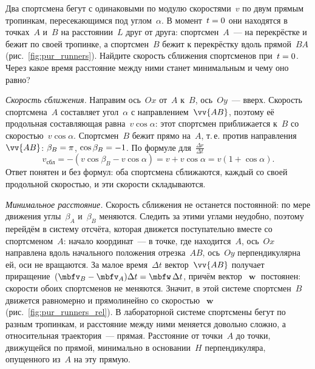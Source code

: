 \documentclass[../main.tex]{subfiles}
\begin{document}
\begin{example}
Два спортсмена бегут с одинаковыми по модулю скоростями~$v$ по двум прямым
тропинкам, пересекающимся под углом~$\alpha$. В момент~$t \hm= 0$ они находятся в
точках~$A$ и~$B$ на расстоянии~$L$ друг от друга: спортсмен~$A$~--- на перекрёстке
и бежит по своей тропинке, а спортсмен~$B$ бежит к перекрёстку вдоль прямой~$BA$
(рис.~\ref{fig:pur_runners}). Найдите скорость сближения спортсменов при~$t \hm= 0$.
Через какое время расстояние между ними станет минимальным и чему оно равно?


\noindent\textit{Скорость сближения.} Направим ось~$Ox$ от~$A$ к~$B$, ось~$Oy$~---
вверх. Скорость спортсмена~$A$ составляет угол~$\alpha$ с направлением~$\vv{AB}$,
поэтому её продольная составляющая равна~$v\cos\alpha$: этот спортсмен приближается
к~$B$ со скоростью~$v\cos\alpha$. Спортсмен~$B$ бежит прямо на~$A$, т.\,е. против
направления~$\vv{AB}$: $\beta_B \hm= \pi$, $\cos\beta_B \hm= -1$. По формуле для~$\frac{\Delta r}{\Delta t}$
\[
v_{\text{сбл}} = -(v\cos\beta_B - v\cos\alpha) = v + v\cos\alpha = v(1 + \cos\alpha).
\]
Ответ понятен и без формул: оба спортсмена сближаются, каждый со своей продольной
скоростью, и эти скорости складываются.

\noindent\textit{Минимальное расстояние.} Скорость сближения не останется
постоянной: по мере движения углы~$\beta_A$ и~$\beta_B$ меняются. Следить за этими
углами неудобно, поэтому перейдём в систему отсчёта, которая движется поступательно
вместе со спортсменом~$A$: начало координат~--- в точке, где находится~$A$, ось~$Ox$
направлена вдоль начального положения отрезка~$AB$, ось~$Oy$ перпендикулярна ей, оси
не вращаются. За малое время~$\Delta t$ вектор~$\vv{AB}$ получает приращение~$(\mbfv_B - \mbfv_A)\Delta t \hm= \mbfw\,\Delta t$, причём вектор~$\mbfw$ постоянен:
скорости обоих спортсменов не меняются. Значит, в этой системе спортсмен~$B$ движется
равномерно и прямолинейно со скоростью~$\mbfw$ (рис.~\ref{fig:pur_runners_rel}). В
лабораторной системе спортсмены бегут по разным тропинкам, и расстояние между ними
меняется довольно сложно, а относительная траектория~--- прямая. Расстояние от точки~$A$ до точки, движущейся по прямой, минимально в основании~$H$ перпендикуляра,
опущенного из~$A$ на эту прямую.



\end{example}
\end{document}
